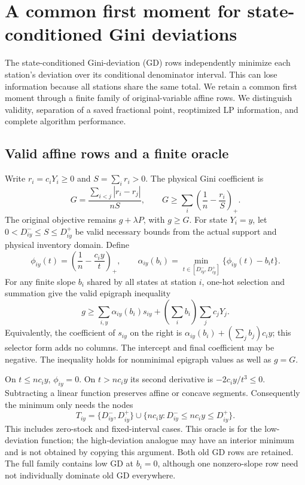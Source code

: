 \section{A common first moment for state-conditioned Gini deviations}
\label{sec:shared-denominator-gd}

The state-conditioned Gini-deviation (GD) rows independently minimize each
station's deviation over its conditional denominator interval. This can lose
information because all stations share the same total. We retain a common
first moment through a finite family of original-variable affine rows. We
distinguish validity, separation of a saved fractional point, reoptimized LP
information, and complete algorithm performance.

\subsection{Valid affine rows and a finite oracle}
Write $r_i=c_iY_i\ge0$ and $S=\sum_i r_i>0$. The physical Gini coefficient is
\[
 G=\frac{\sum_{i<j}|r_i-r_j|}{nS},\qquad
 G\ge\sum_i\left(\frac1n-\frac{r_i}{S}\right)_+.
\]
The original objective remains $g+\lambda P$, with $g\ge G$.
For state $Y_i=y$, let $0<D^-_{iy}\le S\le D^+_{iy}$ be valid necessary
bounds from the actual support and physical inventory domain. Define
\[
 \phi_{iy}(t)=\left(\frac1n-\frac{c_iy}{t}\right)_+,
 \qquad
 \alpha_{iy}(b_i)=\min_{t\in[D^-_{iy},D^+_{iy}]}
       \{\phi_{iy}(t)-b_it\}.
\]
For any finite slope $b_i$ shared by all states at station $i$, one-hot
selection and summation give the valid epigraph inequality
\begin{equation}
 g\ge\sum_{i,y}\alpha_{iy}(b_i)s_{iy}
       +\left(\sum_i b_i\right)\sum_j c_jY_j.
 \label{eq:shared-S-affine}
\end{equation}
Equivalently, the coefficient of $s_{iy}$ on the right is
$\alpha_{iy}(b_i)+(\sum_jb_j)c_iy$; this selector form adds no columns.
The intercept and final coefficient may be negative. The inequality holds
for nonminimal epigraph values as well as $g=G$.

On $t\le nc_iy$, $\phi_{iy}=0$. On $t>nc_iy$ its second derivative is
$-2c_iy/t^3\le0$. Subtracting a linear function preserves affine or concave
segments. Consequently the minimum only needs the nodes
\[
 T_{iy}=\{D^-_{iy},D^+_{iy}\}
       \cup\{nc_iy:D^-_{iy}\le nc_iy\le D^+_{iy}\}.
\]
This includes zero-stock and fixed-interval cases. This oracle is for the
low-deviation function; the high-deviation analogue may have an interior
minimum and is not obtained by copying this argument. Both old GD rows
are retained. The full family contains low GD at $b_i=0$, although one
nonzero-slope row need not individually dominate old GD everywhere.

